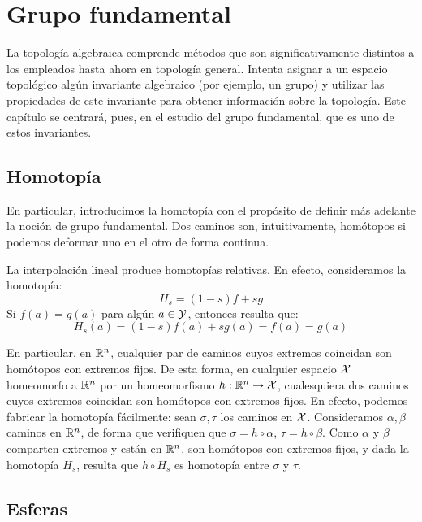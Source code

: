 \chapter{Grupo fundamental}
\label{grf}

La topología algebraica comprende métodos que son significativamente distintos a los empleados hasta ahora en topología general. Intenta asignar a un espacio topológico algún invariante algebraico (por ejemplo, un grupo) y utilizar las propiedades de este invariante para obtener información sobre la topología. Este capítulo se centrará, pues, en el estudio del grupo fundamental, que es uno de estos invariantes.

\section{Homotopía}

En particular, introducimos la homotopía con el propósito de definir más adelante la noción de grupo fundamental. Dos caminos son, intuitivamente, homótopos si podemos deformar uno en el otro de forma continua.


\begin{exa}
	La interpolación lineal produce homotopías relativas. En efecto, consideramos la homotopía:
	\[H_s = (1-s)f + sg\]
	Si $f(a)=g(a)$ para algún $a\in\mathcal{Y}$, entonces resulta que:
	\[H_s(a)=(1-s)f(a)+sg(a)=f(a)=g(a)\]
	
	En particular, en $\mathbb{R}^n$, cualquier par de caminos cuyos extremos coincidan son homótopos con extremos fijos. De esta forma, en cualquier espacio $\mathcal{X}$ homeomorfo a $\mathbb{R}^n$ por un homeomorfismo $h:\mathbb{R}^n\to \mathcal{X}$, cualesquiera dos caminos cuyos extremos coincidan son homótopos con extremos fijos. En efecto, podemos fabricar la homotopía fácilmente: sean $\sigma,\tau$ los caminos en $\mathcal{X}$. Consideramos $\alpha,\beta$ caminos en $\mathbb{R}^n$, de forma que verifiquen que $\sigma = h\circ\alpha$, $\tau = h\circ\beta$. Como $\alpha$ y $\beta$ comparten extremos y están en $\mathbb{R}^n$, son homótopos con extremos fijos, y dada la homotopía $H_s$, resulta que $h\circ H_s$ es homotopía entre $\sigma$ y $\tau$.
\end{exa}

\section{Esferas}

